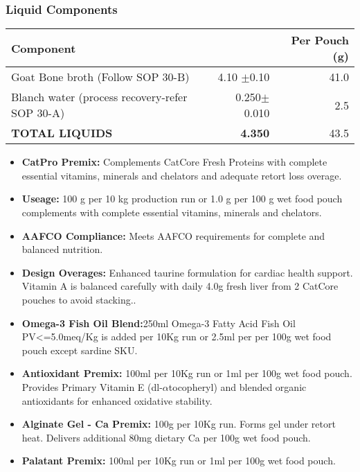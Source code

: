 \subsubsection*{Liquid Components}
\begin{tabular}{@{}lrr@{}}
\toprule
\textbf{Component} & \textbf{Per Batch (kg)  & \textbf{Per Pouch (g)}} \\
\midrule 
Goat Bone broth (Follow SOP 30-B) &  4.10 $\pm$0.10 & 41.0 \\
Blanch water (process recovery-refer SOP 30-A) & 0.250$\pm$0.010 & 2.5 \\
\textbf{TOTAL LIQUIDS} & \textbf {4.350} & {43.5} \textbf \\
\midrule

\bottomrule

\end{tabular}

\vspace{1em}

\begin{itemize}
\item \textbf{CatPro Premix: } Complements CatCore Fresh Proteins with complete essential vitamins, minerals and chelators and adequate retort loss overage.
\item \textbf{Useage:} 100 g per 10 kg production run or 1.0 g per 100 g wet food pouch complements with complete essential vitamins, minerals and chelators. \item\textbf{AAFCO Compliance: } Meets AAFCO requirements for complete and balanced nutrition.
\item\textbf{Design Overages: }Enhanced taurine formulation for cardiac health support. Vitamin A is balanced carefully with daily 4.0g fresh liver from 2 CatCore pouches to avoid stacking.\cite{ref64}.  
\item \textbf{Omega-3 Fish Oil Blend:}250ml Omega-3 Fatty Acid Fish Oil PV<=5.0meq/Kg is added per 10Kg run or 2.5ml per per 100g wet food pouch except sardine SKU.
\item \textbf{Antioxidant Premix: } 100ml per 10Kg run or 1ml per 100g wet food pouch. Provides Primary Vitamin E (dl-$\alpha$tocopheryl) and blended organic antioxidants for enhanced oxidative stability.
\item \textbf{Alginate Gel - Ca Premix:} 100g per 10Kg run.  Forms gel under retort heat. Delivers additional 80mg dietary Ca per 100g wet food pouch.
\item \textbf{Palatant Premix: } 100ml per 10Kg run or 1ml per 100g wet food pouch.
\end{itemize}



